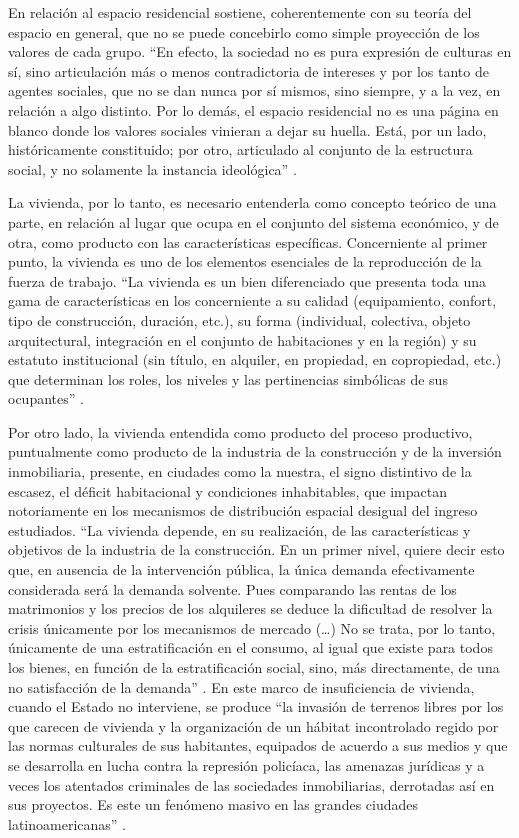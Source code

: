 	En relación al espacio residencial sostiene, coherentemente con su teoría del espacio en general, que no se puede concebirlo como simple proyección de los valores de cada grupo. “En efecto, la sociedad no es pura expresión de culturas en sí, sino articulación más o menos contradictoria de intereses y por los tanto de agentes sociales, que no se dan nunca por sí mismos, sino siempre, y a la vez, en relación a algo distinto. Por lo demás, el espacio residencial no es una página en blanco donde los valores sociales vinieran a dejar su huella. Está, por un lado, históricamente constituido; por otro, articulado al conjunto de la estructura social, y no solamente la instancia ideológica” \cite[p.~136]{castells}.
	
	La vivienda, por lo tanto, es necesario entenderla como concepto teórico de una parte, en relación al lugar que ocupa en el conjunto del sistema económico, y de otra, como producto con las características específicas. Concerniente al primer punto, la vivienda es uno de los elementos esenciales de la reproducción de la fuerza de trabajo. “La vivienda es un bien diferenciado que presenta toda una gama de características en los concerniente a su calidad (equipamiento, confort, tipo de construcción, duración, etc.), su forma (individual, colectiva, objeto arquitectural, integración en el conjunto de habitaciones y en la región) y su estatuto institucional (sin título, en alquiler, en propiedad, en copropiedad, etc.) que determinan los roles, los niveles y las pertinencias simbólicas de sus ocupantes” \cite[p.~179]{castells} .
	
	Por otro lado, la vivienda entendida como producto del proceso productivo, puntualmente como producto de la industria de la construcción y de la inversión inmobiliaria, presente, en ciudades como la nuestra, el signo distintivo de la escasez, el déficit habitacional y condiciones inhabitables, que impactan notoriamente en los mecanismos de distribución espacial desigual del ingreso estudiados. “La vivienda depende, en su realización, de las características y objetivos de la industria de la construcción. En un primer nivel, quiere decir esto que, en ausencia de la intervención pública, la única demanda efectivamente considerada será la demanda solvente. Pues comparando las rentas de los matrimonios y los precios de los alquileres se deduce la dificultad de resolver la crisis únicamente por los mecanismos de mercado (…) No se trata, por lo tanto, únicamente de una estratificación en el consumo, al igual que existe para todos los bienes, en función de la estratificación social, sino, más directamente, de una no satisfacción de la demanda” \cite[p.~182]{castells}. En este marco de insuficiencia de vivienda, cuando el Estado no interviene, se produce “la invasión de terrenos libres por los que carecen de vivienda y la organización de un hábitat incontrolado regido por las normas culturales de sus habitantes, equipados de acuerdo a sus medios y que se desarrolla en lucha contra la represión policíaca, las amenazas jurídicas y a veces los atentados criminales de las sociedades inmobiliarias, derrotadas así en sus proyectos. Es este un fenómeno masivo en las grandes ciudades latinoamericanas” \cite[p.~203]{castells}.
	
